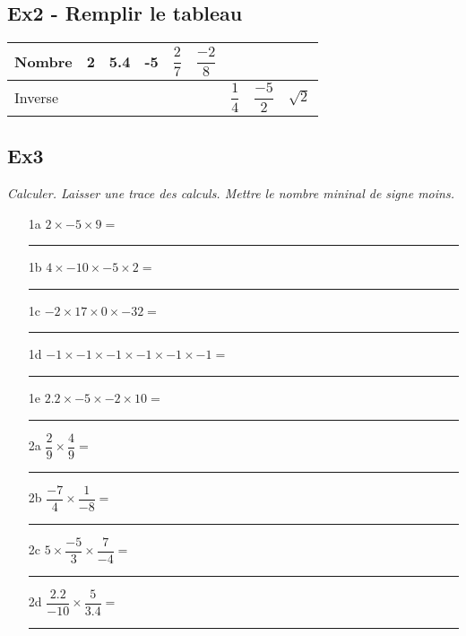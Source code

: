\documentclass[12pt]{article}
\begin{document}

\subsection*{Ex2 - Remplir le tableau}

\begin{center}
  \begin{tabular}{| l || c | c | c | c | c | c | c | c | }
    \hline
    Nombre & 2                 & 5.4               & -5               & $\dfrac{2}{7}$   & $\dfrac{-2}{8}$  & \phantom{azerty} & \phantom{azerty} & \phantom{azerty}  \\
    \hline
    Inverse & \phantom{azerty}  & \phantom{azerty}  & \phantom{azerty} & \phantom{azerty} & \phantom{azerty} & $\dfrac{1}{4}$   & $\dfrac{-5}{2}$  & $ \sqrt{2}$ \\
    \hline
  \end{tabular}
\end{center}


\subsection*{Ex3}
\textit{Calculer. Laisser une trace des calculs. Mettre le nombre mininal de signe moins.}

\begin{multicols}{2}
  
\begin{enumerate}
\item[1a] $2 \times  -5 \times 9 = $\\
  \rule{\linewidth}{0.5pt}
\item[1b] $4 \times  -10 \times -5 \times 2 = $\\
  \rule{\linewidth}{0.5pt}
\item[1c] $-2 \times 17 \times 0 \times -32 = $\\
  \rule{\linewidth}{0.5pt}
\item[1d] $-1 \times -1 \times -1 \times -1 \times -1  \times -1 = $\\
  \rule{\linewidth}{0.5pt}
\item[1e] $2.2 \times -5 \times -2 \times 10 = $\\
  \rule{\linewidth}{0.5pt}   
\end{enumerate}


\begin{enumerate}
\item[2a] $ \dfrac{2}{9} \times \dfrac{4}{9} = $\\
  \rule{\linewidth}{0.5pt}
\item[2b] $ \dfrac{-7}{4} \times \dfrac{1}{-8} = $\\
  \rule{\linewidth}{0.5pt}
\item[2c] $ 5 \times \dfrac{-5}{3} \times \dfrac{7}{-4} = $\\
    \rule{\linewidth}{0.5pt}
\item[2d] $ \dfrac{2.2}{-10} \times \dfrac{5}{3.4} = $\\
  \rule{\linewidth}{0.5pt}
\end{enumerate}

\end{multicols}
\end{document}
